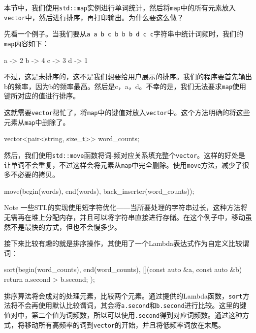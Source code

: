 
本节中，我们使用\texttt{std::map}实例进行单词统计，然后将\texttt{map}中的所有元素放入\texttt{vector}中，然后进行排序，再打印输出。为什么要这么做？

先看一个例子。当我们要从\texttt{a a b c b b b d c c}字符串中统计词频时，我们的\texttt{map}内容如下：

\begin{codebox}[text]
a -> 2
b -> 4
c -> 3
d -> 1
\end{codebox}

不过，这是未排序的，这不是我们想要给用户展示的排序。我们的程序要首先输出b的频率，因为b的频率最高。然后是c，a，d。不幸的是，我们无法要求\texttt{map}使用键所对应的值进行排序。

这就需要\texttt{vector}帮忙了，将\texttt{map}中的键值对放入\texttt{vector}中。这个方法明确的将这些元素从\texttt{map}中删除了。

\begin{codebox}[cpp]
vector<pair<string, size_t>> word_counts;
\end{codebox}

然后，我们使用\texttt{std::move}函数将词-频对应关系填充整个\texttt{vector}。这样的好处是让单词不会重复，不过这样会将元素从\texttt{map}中完全删除。使用\texttt{move}方法，减少了很多不必要的拷贝。

\begin{codebox}[cpp]
move(begin(words), end(words), back_inserter(word_counts));
\end{codebox}

\begin{myInfoBox}
Note 一些STL的实现使用短字符优化——当所要处理的字符串过长，这种方法将无需再在堆上分配内存，并且可以将字符串直接进行存储。在这个例子中，移动虽然不是最快的方式，但也不会慢多少。
\end{myInfoBox}

接下来比较有趣的就是排序操作，其使用了一个Lambda表达式作为自定义比较谓词：

\begin{codebox}[cpp]
sort(begin(word_counts), end(word_counts),
    [](const auto &a, const auto &b) { return a.second > b.second; });
\end{codebox}

排序算法将会成对的处理元素，比较两个元素。通过提供的Lambda函数，\texttt{sort}方法将不会再使用默认比较谓词，其会将\texttt{a.second}和\texttt{b.second}进行比较。这里的键值对中，第二个值为词频数，所以可以使用\texttt{.second}得到对应词频数。通过这种方式，将移动所有高频率的词到\texttt{vector}的开始，并且将低频率词放在末尾。


